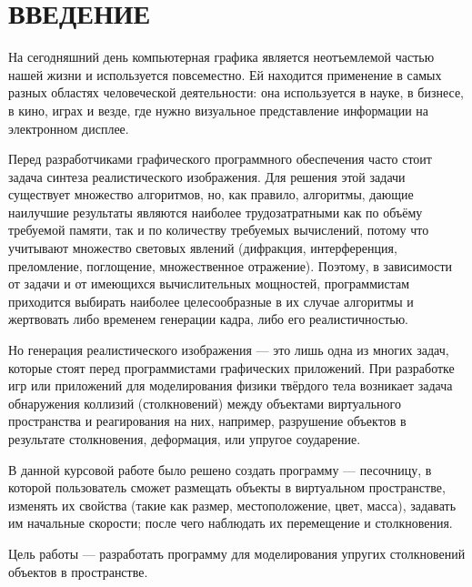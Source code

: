 \section*{ВВЕДЕНИЕ}

На сегодняшний день компьютерная графика является неотъемлемой частью нашей жизни и используется повсеместно.
Ей находится применение в самых разных областях человеческой деятельности: она используется в науке, в бизнесе, в кино, играх и везде, где нужно визуальное представление информации на электронном дисплее.

Перед разработчиками графического программного обеспечения часто стоит задача синтеза реалистического изображения.
Для решения этой задачи существует множество алгоритмов, но, как правило, алгоритмы, дающие наилучшие результаты являются наиболее трудозатратными как по объёму требуемой памяти, так и по количеству требуемых вычислений, потому что учитывают множество световых явлений (дифракция, интерференция, преломление, поглощение, множественное отражение).
Поэтому, в зависимости от задачи и от имеющихся вычислительных мощностей, программистам приходится выбирать наиболее целесообразные в их случае алгоритмы и жертвовать либо временем генерации кадра, либо его реалистичностью.

Но генерация реалистического изображения --- это лишь одна из многих задач, которые стоят перед программистами графических приложений.
При разработке игр или приложений для моделирования физики твёрдого тела возникает задача обнаружения коллизий (столкновений) между объектами виртуального пространства и реагирования на них, например, разрушение объектов в результате столкновения, деформация, или упругое соударение.

В данной курсовой работе было решено создать программу --- песочницу, в которой пользователь сможет размещать объекты в виртуальном пространстве, изменять их свойства (такие как размер, местоположение, цвет, масса), задавать им начальные скорости; после чего наблюдать их перемещение и столкновения.

Цель работы --- разработать программу для моделирования упругих столкновений объектов в пространстве.

